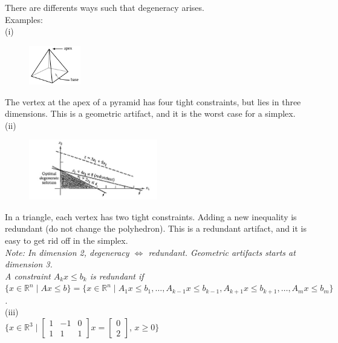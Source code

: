 \documentclass[main]{subfiles}
\begin{document}
There are differents ways such that degeneracy arises.\\
Examples:\\

(i)\\
\begin{figure}[!h]
  \label{fig:projection}
  \centering
    \includegraphics[width=0.2\textwidth]{imgs/pyramide.png}
\end{figure}

The vertex at the apex of a pyramid has four tight constraints, but lies in 
three dimensions. This is a geometric artifact, and it is the worst case for a
simplex.\\

(ii)\\
\begin{figure}[!h]
  \label{fig:projection}
  \centering
    \includegraphics[width=0.5\textwidth]{imgs/triangle-degeneracy.png}
\end{figure}

In a triangle, each vertex has two tight constraints. Adding a new inequality
is redundant (do not change the polyhedron). This is a redundant artifact, and
it is easy to get rid off in the simplex.\\

\emph{Note: In dimension 2, degeneracy $\iff$ redundant. Geometric artifacts
starts at dimension 3.}\\

\emph{A constraint $A_k x \leq b_k$ is redundant if $\{ x\in \mathbb{R}^n \mid
Ax \leq b \} = \{x \in \mathbb{R}^n \mid A_1 x \leq b_1, \dots, A_{k-1} x \leq
b_{k-1}, A_{k+1} x \leq b_{k+1}, \dots, A_m x \leq b_m \}$.}\\

(iii)\\
$\{x \in \mathbb{R}^3 \mid 
\begin{bmatrix}
1 & -1 & 0\\
1 & 1 & 1
\end{bmatrix}
x =
\begin{bmatrix}
0\\
2
\end{bmatrix}$, $x \geq 0 \}$\\
\end{document}
